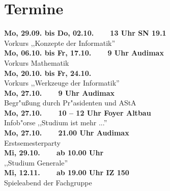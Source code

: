 \section{Termine}

\textbf{Mo, 29.09. bis Do, 02.10.~~~~13 Uhr SN 19.1} \\
Vorkurs ,,Konzepte der Informatik'' \\

\textbf{Mo, 06.10. bis Fr, 17.10.~~~~9 Uhr Audimax} \\
Vorkurs Mathematik \\

\textbf{Mo, 20.10. bis Fr, 24.10.} \\
Vorkurs ,,Werkzeuge der Informatik'' \\

\textbf{Mo, 27.10.~~~~9 Uhr Audimax} \\
Begr"u{\ss}ung durch Pr"asidenten und AStA \\

\textbf{Mo, 27.10.~~~~10 -- 12 Uhr Foyer Altbau} \\
Infob"orse ,,Studium ist mehr ...'' \\

\textbf{Mo, 27.10.~~~~21.00 Uhr Audimax} \\
Erstsemesterparty \\

\textbf{Mi, 29.10.~~~~ab 10.00 Uhr}  \\
,,Studium Generale'' \\

\textbf{Mi, 12.11.~~~~ab 19.00 Uhr IZ 150} \\
Spieleabend der Fachgruppe \\


